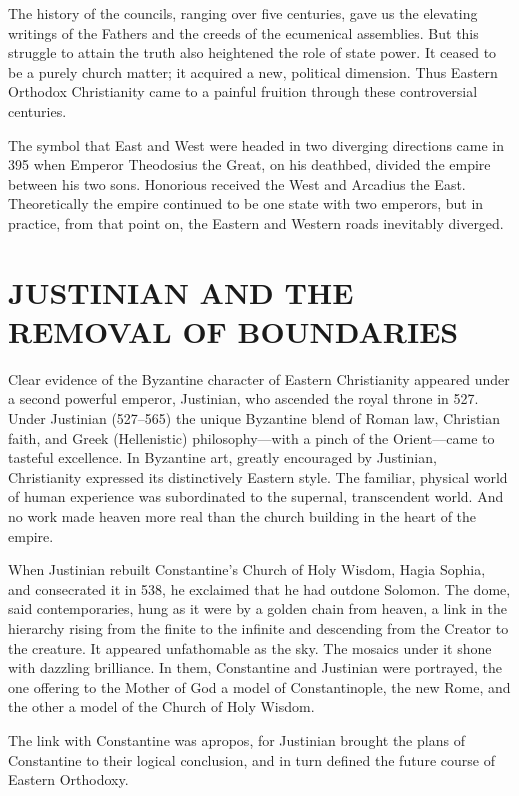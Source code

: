 The history of the councils, ranging over five centuries, gave us the elevating writings of the
Fathers and the creeds of the ecumenical assemblies. But this struggle to attain the truth also
heightened the role of state power. It ceased to be a purely church matter; it acquired a new,
political dimension. Thus Eastern Orthodox Christianity came to a painful fruition through these
controversial centuries.

The symbol that East and West were headed in two diverging directions came in 395 when Emperor
Theodosius the Great, on his deathbed, divided the empire between his two sons. Honorious received
the West and Arcadius the East. Theoretically the empire continued to be one state with two
emperors, but in practice, from that point on, the Eastern and Western roads inevitably diverged.

\section{JUSTINIAN AND THE REMOVAL OF BOUNDARIES}

Clear evidence of the Byzantine character of Eastern Christianity appeared under a second powerful
emperor, Justinian, who ascended the royal throne in 527. Under Justinian (527–565) the unique
Byzantine blend of Roman law, Christian faith, and Greek (Hellenistic) philosophy—with a pinch of
the Orient—came to tasteful excellence. In Byzantine art, greatly encouraged by Justinian,
Christianity expressed its distinctively Eastern style. The familiar, physical world of human
experience was subordinated to the supernal, transcendent world. And no work made heaven more real
than the church building in the heart of the empire.

When Justinian rebuilt Constantine’s Church of Holy Wisdom, Hagia Sophia, and consecrated it in 538,
he exclaimed that he had outdone Solomon. The dome, said contemporaries, hung as it were by a golden
chain from heaven, a link in the hierarchy rising from the finite to the infinite and descending
from the Creator to the creature. It appeared unfathomable as the sky. The mosaics under it shone
with dazzling brilliance. In them, Constantine and Justinian were portrayed, the one offering to the
Mother of God a model of Constantinople, the new Rome, and the other a model of the Church of Holy
Wisdom.

The link with Constantine was apropos, for Justinian brought the plans of Constantine to their
logical conclusion, and in turn defined the future course of Eastern Orthodoxy.

